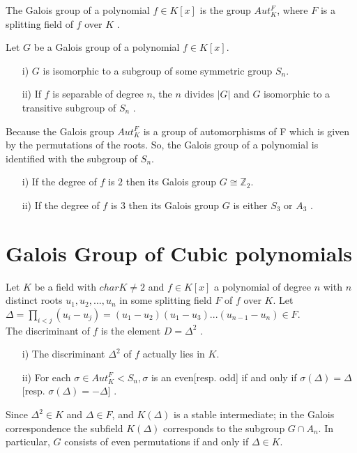 \begin{definition}
  The Galois group of a polynomial \(f \in K[x]\) is the group \(Aut_K^F\), where \(F\) is a splitting field of \(f\) over \(K\) \cite{hunger}.
  \end{definition}

  \begin{theorem}
  Let \(G\) be a Galois group of a polynomial \(f \in K[x]\).
\begin{enumerate}
\item[i)] \(G\) is isomorphic to a subgroup of some symmetric group \(S_n\).
  \item[ii)] If \(f\) is separable of degree \(n\), the \(n\) divides \(|G|\) and \(G\) isomorphic to a transitive subgroup of \(S_n\) \cite{hunger}.
  \end{enumerate}
\end{theorem}
Because the Galois group \(Aut_K^F\) is a group of automorphisms of F which is given by the permutations of the roots.
So, the Galois group of a polynomial is identified with the subgroup of \(S_n\).\\

\begin{corollary}
\begin{enumerate}
\item[i)] If the degree of \(f\) is \(2\) then its Galois group \(G \cong {\mathbb{Z}}_2\).
  \item[ii)] If the degree of \(f\) is \(3\) then its Galois group \(G\) is either \(S_3\) or \(A_3\) \cite{hunger}.
  \end{enumerate}
\end{corollary}


\section{Galois Group of Cubic polynomials}
\begin{definition}
  Let \(K\) be a field with \(char K \neq 2\) and \(f \in K[x]\) a polynomial of degree \(n\) with \(n\) distinct roots \(u_1,u_2,...,u_n\) in some splitting field \(F\) of \(f\) over \(K\). Let \(\Delta = \prod\limits_{i<j}(u_i-u_j) = (u_1-u_2)(u_1-u_3)...(u_{n-1}-u_n) \in F\).\\
  The discriminant of \(f\) is the element \(D= {\Delta}^2\) \cite{hunger}.
\end{definition}

\begin{theorem}
\begin{enumerate}
\item[i)] The discriminant \({\Delta}^2\) of \(f\) actually lies in \(K\).
  \item[ii)] For each \(\sigma \in Aut_K^F < S_n, \sigma\) is an even[resp. odd] if and only if \(\sigma(\Delta) = \Delta\)[resp. \(\sigma(\Delta) = - \Delta\)] \cite{hunger}.
  \end{enumerate}
\end{theorem}
Since \({\Delta}^2 \in K\) and \(\Delta \in F\), and \(K(\Delta)\) is a stable intermediate; in the Galois correspondence the subfield \(K(\Delta)\) corresponds to the subgroup \(G \cap A_n\). In particular, \(G\) consists of even permutations if and only if \(\Delta \in K\).

